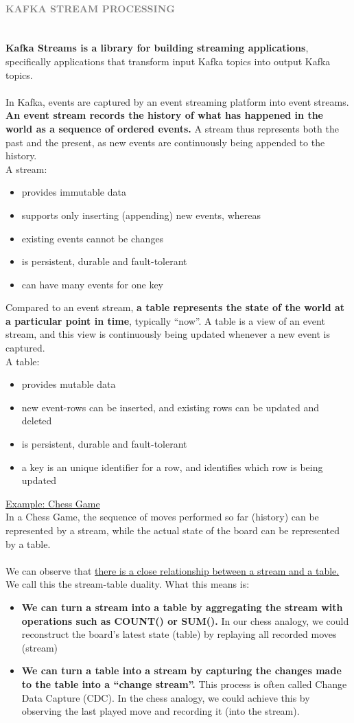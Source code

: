 \documentclass[10pt,a4paper]{article}
\newcommand{\nline}{\\~\\}
\newcommand{\myparagraph}[1]{\paragraph{\normalsize{\textcolor{gray}{\uppercase{\textbf{#1}}}} }\mbox{} \vspace{0.5em}\\}
\begin{document}
\myparagraph{Kafka Stream Processing}
\textbf{Kafka Streams is a library for building streaming applications}, specifically applications that transform input Kafka topics into output Kafka topics. 
\nline
In Kafka, events are captured by an event streaming platform into event streams. \textbf{An event stream records the history of what has happened in the world as a sequence of ordered events.} A stream thus represents both the past and the present, as new events are continuously being appended to the history. \\
A stream:
\begin{itemize}
	\item provides immutable data
	\item supports only inserting (appending) new events, whereas 	\item existing events cannot be changes
	\item is persistent, durable and fault-tolerant
	\item can have many events for one key
\end{itemize}
Compared to an event stream, \textbf{a table represents the state of the world at a particular point in time}, typically “now”. A table is a view of an event stream, and this view is continuously being updated whenever a new event is captured. \\
A table: 
\begin{itemize}
	\item provides mutable data
	\item new event-rows can be inserted, and existing rows can be updated and deleted
	\item is persistent, durable and fault-tolerant
	\item a key is an unique identifier for a row, and identifies which row is being updated
\end{itemize}
\uline{Example: Chess Game} \\
In a Chess Game, the sequence of moves performed so far (history) can be represented by a stream, while the actual state of the board can be represented by a table.
\nline
We can observe that \uline{there is a close relationship between a stream and a table.} We call this the stream-table duality. What this means is:
\begin{itemize}
	\item \textbf{We can turn a stream into a table by aggregating the stream with operations such as COUNT() or SUM().} In our chess analogy, we could reconstruct the board’s latest state (table) by replaying all recorded moves (stream)
	\item \textbf{We can turn a table into a stream by capturing the changes made to the table into a “change stream”.} This process is often called Change Data Capture (CDC). In the chess analogy, we could achieve this by observing the last played move and recording it (into the stream).
\end{itemize}
\end{document}
